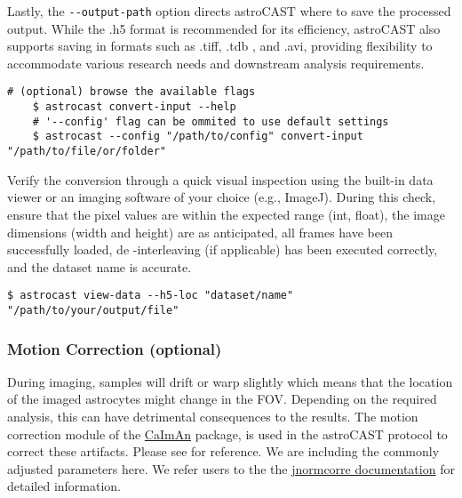 Lastly, the \lstinline[style=bashStyle]{--output-path} option directs astroCAST where to save the processed output.
While the .h5 format is recommended for its efficiency, astroCAST also supports saving in formats such as .tiff, .tdb
, and .avi, providing flexibility to accommodate various research needs and downstream analysis requirements.

\begin{lstlisting}[style=bashStyle]
    # (optional) browse the available flags
    $ astrocast convert-input --help
    # '--config' flag can be ommited to use default settings
    $ astrocast --config "/path/to/config" convert-input "/path/to/file/or/folder"
\end{lstlisting}

Verify the conversion through a quick visual inspection using the built-in data viewer or an imaging software
of your choice (e.g., ImageJ). During this check, ensure that the pixel values are within the expected range (int,
float), the image dimensions (width and height) are as anticipated, all frames have been successfully loaded, de
-interleaving (if applicable) has been executed correctly, and the dataset name is accurate.

\begin{lstlisting}[style=bashStyle]
    $ astrocast view-data --h5-loc "dataset/name" "/path/to/your/output/file"
\end{lstlisting}


\subsubsection{Motion Correction (optional)}

During imaging, samples will drift or warp slightly which means that the location of the imaged astrocytes might change in the \ac{FOV}. Depending on the required analysis, this can have detrimental consequences to the results. The motion correction module of the \href{https://github.com/flatironinstitute/CaImAn}{CaImAn} package\citep{giovannucci_caiman_2019}, is used in the astroCAST protocol to correct these artifacts. Please see  for reference. We are including the commonly adjusted parameters here. We refer users to the the \href{https://jnormcorre.readthedocs.io/en/latest/Algo.html#motion-correction-methods}{jnormcorre documentation} for detailed information.

